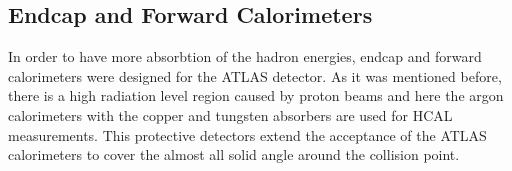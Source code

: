 \documentclass[a4paper,9pt]{article}
\begin{document}
\subsection{Endcap and Forward Calorimeters}
In order to have more absorbtion of the hadron energies, endcap and
forward calorimeters were designed for the ATLAS detector. As it was
mentioned before, there is a high radiation level region caused by proton
beams and here the argon calorimeters with the copper and tungsten absorbers
are used for HCAL measurements. This protective detectors extend the
acceptance of the ATLAS calorimeters to cover the almost all solid
angle around the collision point.
\end{document}
